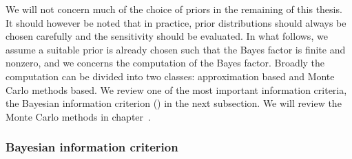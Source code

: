 \documentclass[11pt, hyper, bib, fontset=Minion]{marticle}
\begin{document}
We will not concern much of the choice of priors in the remaining of this
thesis. It should however be noted that in practice, prior distributions
should always be chosen carefully and the sensitivity should be evaluated. In
what follows, we assume a suitable prior is already chosen such that the Bayes
factor is finite and nonzero, and we concerns the computation of the Bayes
factor. Broadly the computation can be divided into two classes: approximation
based and Monte Carlo methods based. We review one of the most important
information criteria, the Bayesian information criterion (\bic) in the next
subsection. We will review the Monte Carlo methods in chapter~.

\subsubsection{Bayesian information criterion}
\label{ssub:Bayesian information criterion}
\end{document}
